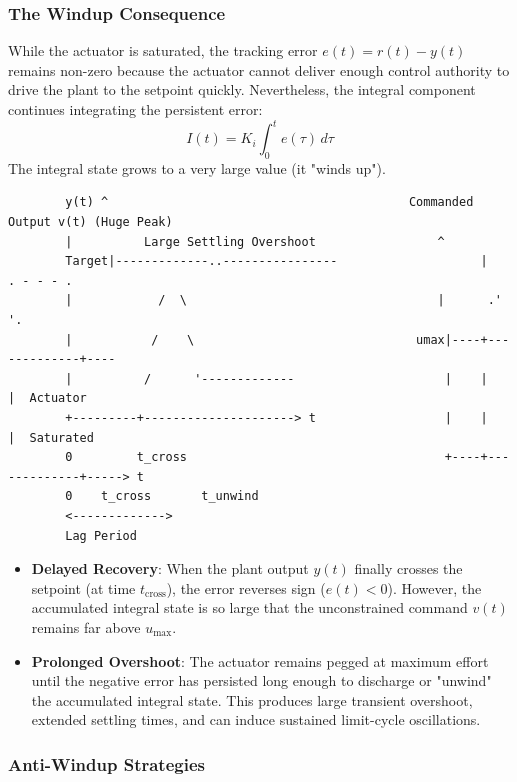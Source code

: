 \documentclass[12pt,onecolumn,twoside ]{article}
\begin{document}
	\subsubsection{The Windup Consequence}
	While the actuator is saturated, the tracking error $e(t) = r(t) - y(t)$ remains non-zero because the actuator cannot deliver enough control authority to drive the plant to the setpoint quickly. Nevertheless, the integral component continues integrating the persistent error: \[
	I(t) = K_i \int_{0}^{t} e(\tau)\, d\tau
	\] The integral state grows to a very large value (it "winds up").
	\begin{lstlisting}
		y(t) ^                                          Commanded Output v(t) (Huge Peak)
		|          Large Settling Overshoot                 ^
		Target|-------------..----------------                    |        . - - - .
		|            /  \                                   |      .'         '.
		|           /    \                               umax|----+-------------+----
		|          /      '-------------                     |    |             |  Actuator
		+---------+---------------------> t                  |    |             |  Saturated
		0         t_cross                                    +----+-------------+-----> t
		0    t_cross       t_unwind
		<------------->
		Lag Period
	\end{lstlisting}
	\begin{itemize}
		\item
		\textbf{Delayed Recovery}: When the plant output $y(t)$ finally crosses the setpoint (at time $t_{\text{cross}}$), the error reverses sign ($e(t) < 0$). However, the accumulated integral state is so large that the unconstrained command $v(t)$ remains far above $u_{\max}$.
		\item
		\textbf{Prolonged Overshoot}: The actuator remains pegged at maximum effort until the negative error has persisted long enough to discharge or "unwind" the accumulated integral state. This produces large transient overshoot, extended settling times, and can induce sustained limit-cycle oscillations.
	\end{itemize}
	
	\subsubsection{Anti-Windup Strategies}
\end{document}
